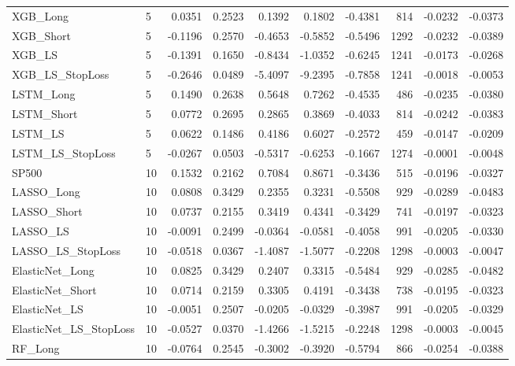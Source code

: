 \begin{tabular}{llrrrrrrrr}
\cline{1-10}
XGB\_Long & 5 & 0.0351 & 0.2523 & 0.1392 & 0.1802 & -0.4381 & 814 & -0.0232 & -0.0373 \\
\cline{1-10}
XGB\_Short & 5 & -0.1196 & 0.2570 & -0.4653 & -0.5852 & -0.5496 & 1292 & -0.0232 & -0.0389 \\
\cline{1-10}
XGB\_LS & 5 & -0.1391 & 0.1650 & -0.8434 & -1.0352 & -0.6245 & 1241 & -0.0173 & -0.0268 \\
\cline{1-10}
XGB\_LS\_StopLoss & 5 & -0.2646 & 0.0489 & -5.4097 & -9.2395 & -0.7858 & 1241 & -0.0018 & -0.0053 \\
\cline{1-10}
LSTM\_Long & 5 & 0.1490 & 0.2638 & 0.5648 & 0.7262 & -0.4535 & 486 & -0.0235 & -0.0380 \\
\cline{1-10}
LSTM\_Short & 5 & 0.0772 & 0.2695 & 0.2865 & 0.3869 & -0.4033 & 814 & -0.0242 & -0.0383 \\
\cline{1-10}
LSTM\_LS & 5 & 0.0622 & 0.1486 & 0.4186 & 0.6027 & -0.2572 & 459 & -0.0147 & -0.0209 \\
\cline{1-10}
LSTM\_LS\_StopLoss & 5 & -0.0267 & 0.0503 & -0.5317 & -0.6253 & -0.1667 & 1274 & -0.0001 & -0.0048 \\
\cline{1-10}
SP500 & 10 & 0.1532 & 0.2162 & 0.7084 & 0.8671 & -0.3436 & 515 & -0.0196 & -0.0327 \\
\cline{1-10}
LASSO\_Long & 10 & 0.0808 & 0.3429 & 0.2355 & 0.3231 & -0.5508 & 929 & -0.0289 & -0.0483 \\
\cline{1-10}
LASSO\_Short & 10 & 0.0737 & 0.2155 & 0.3419 & 0.4341 & -0.3429 & 741 & -0.0197 & -0.0323 \\
\cline{1-10}
LASSO\_LS & 10 & -0.0091 & 0.2499 & -0.0364 & -0.0581 & -0.4058 & 991 & -0.0205 & -0.0330 \\
\cline{1-10}
LASSO\_LS\_StopLoss & 10 & -0.0518 & 0.0367 & -1.4087 & -1.5077 & -0.2208 & 1298 & -0.0003 & -0.0047 \\
\cline{1-10}
ElasticNet\_Long & 10 & 0.0825 & 0.3429 & 0.2407 & 0.3315 & -0.5484 & 929 & -0.0285 & -0.0482 \\
\cline{1-10}
ElasticNet\_Short & 10 & 0.0714 & 0.2159 & 0.3305 & 0.4191 & -0.3438 & 738 & -0.0195 & -0.0323 \\
\cline{1-10}
ElasticNet\_LS & 10 & -0.0051 & 0.2507 & -0.0205 & -0.0329 & -0.3987 & 991 & -0.0205 & -0.0329 \\
\cline{1-10}
ElasticNet\_LS\_StopLoss & 10 & -0.0527 & 0.0370 & -1.4266 & -1.5215 & -0.2248 & 1298 & -0.0003 & -0.0045 \\
\cline{1-10}
RF\_Long & 10 & -0.0764 & 0.2545 & -0.3002 & -0.3920 & -0.5794 & 866 & -0.0254 & -0.0388 \\

\end{tabular}

